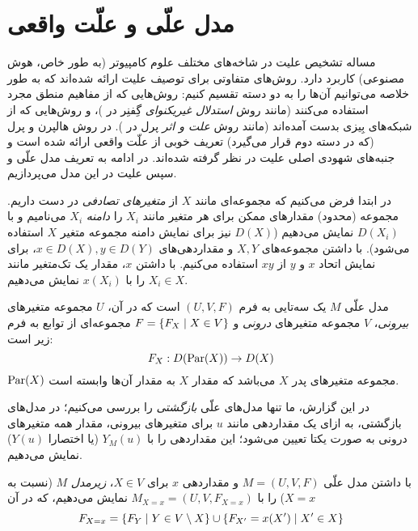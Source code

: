 \section{مدل علّی و علّت واقعی}\label{sec:causality}

مساله تشخیص علیت در شاخه‌های مختلف علوم کامپیوتر
(به طور خاص، هوش مصنوعی)
کاربرد دارد. روش‌های متفاوتی برای توصیف علیت ارائه شده‌اند
که به طور خلاصه می‌توانیم آن‌ها را به دو دسته تقسیم کنیم:
روش‌هایی که از مفاهیم منطق مجرد استفاده می‌کنند
(مانند روش
\textit{استدلال غیریکنوای}
گِفنِر در
\cite{geffner1990causal})،
و روش‌هایی که از شبکه‌های بِیزی بدست آمده‌اند
(مانند روش
\textit{علت و اثر}
پرل در
\cite{pearl1999reasoning}).
در روش هالپرن و پرل
(که در دسته دوم قرار می‌گیرد)
تعریف خوبی از علّت واقعی ارائه شده است و
جنبه‌های شهودی اصلی علیت در نظر گرفته شده‌اند.
در ادامه به تعریف مدل علّی
و سپس علیت در این مدل می‌پردازیم.

در ابتدا فرض می‌کنیم که مجموعه‌ای مانند
$X$
از
\textit{متغیرهای تصادفی}
در دست داریم.
مجموعه
(محدود)
مقدارهای ممکن برای هر متغیر مانند
$X_i$
را
\textit{دامنه} $X_i$
می‌نامیم و با
$D(X_i)$
نمایش می‌دهیم
($D(X)$
نیز برای نمایش دامنه مجموعه متغیر
$X$
استفاده می‌شود).
با داشتن مجموعه‌های
$X,Y$
و مقداردهی‌های
$x \in D(X), y \in D(Y)$،
برای نمایش اتحاد
$x$ و $y$
از
$xy$
استفاده می‌کنیم.
با داشتن
$x$،
مقدار یک تک‌متغیر
مانند
$X_i \in X$
را با
$x(X_i)$
نمایش می‌دهیم.

\begin{definition}\label{def:causal-model}
  مدل علّی
  $M$
  یک سه‌تایی به فرم
  $(U,V,F)$
  است که در آن،
  $U$
  مجموعه متغیرهای
  \textit{بیرونی}،
  $V$
  مجموعه متغیرهای
  \textit{درونی}
  و
  $F = \left\{ F_X \mid X \in V \right\}$
  مجموعه‌ای از توابع به فرم زیر است:
  \[ F_X: D(\operatorname{Par}(X)) \to D(X) \]
  $\operatorname{Par}(X)$
  مجموعه متغیرهای پدر
  $X$
  می‌باشد که مقدار
  $X$
  به مقدار آن‌ها وابسته است.
\end{definition}

در این گزارش، ما تنها مدل‌های علّی
\textit{بازگشتی}
را بررسی می‌کنیم؛ در مدل‌های بازگشتی،
به ازای یک مقداردهی مانند
$u$
برای متغیرهای بیرونی،
مقدار همه متغیرهای درونی
به صورت یکتا تعیین می‌شود؛
این مقداردهی را با
$Y_M(u)$ (یا اختصارا
$Y(u)$)
نمایش می‌دهیم.

\begin{definition}\label{def:causal-submodel}
  با داشتن مدل علّی
  $M=(U,V,F)$
  و مقداردهی
  $x$
  برای
  $X \in V$،
  \textit{زیرمدل} $M$
  (نسبت به
  $X=x$)
  را با
  $M_{X=x} = (U, V, F_{X=x})$
  نمایش می‌دهیم، که در آن
  \begin{equation*}
    F_{X=x} =
      \left\{ F_Y \mid Y \in V \setminus X \right\} \cup
      \left\{ F_{X'} = x(X') \mid X' \in X \right\}
  \end{equation*}
\end{definition}

